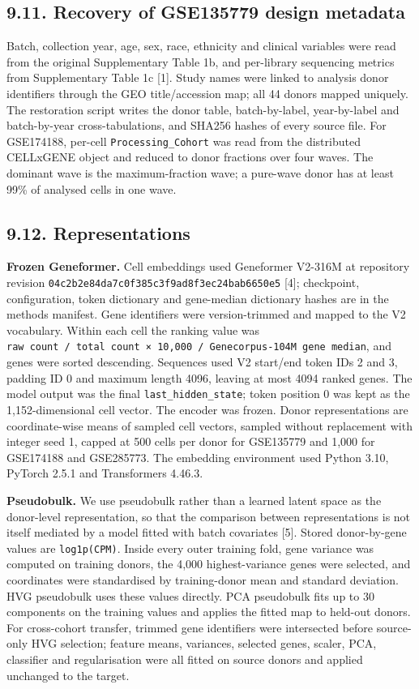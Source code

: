 \subsection{9.11. Recovery of GSE135779 design metadata}\label{recovery-of-gse135779-design-metadata}

Batch, collection year, age, sex, race, ethnicity and clinical variables were read from the original Supplementary Table 1b, and per-library sequencing metrics from Supplementary Table 1c {[}1{]}. Study names were linked to analysis donor identifiers through the GEO title/accession map; all 44 donors mapped uniquely. The restoration script writes the donor table, batch-by-label, year-by-label and batch-by-year cross-tabulations, and SHA256 hashes of every source file. For GSE174188, per-cell \texttt{Processing\_Cohort} was read from the distributed CELLxGENE object and reduced to donor fractions over four waves. The dominant wave is the maximum-fraction wave; a pure-wave donor has at least 99\% of analysed cells in one wave.

\subsection{9.12. Representations}\label{representations}

\textbf{Frozen Geneformer.} Cell embeddings used Geneformer V2-316M at repository revision \texttt{04c2b2e84da7c0f385c3f9ad8f3ec24bab6650e5} {[}4{]}; checkpoint, configuration, token dictionary and gene-median dictionary hashes are in the methods manifest. Gene identifiers were version-trimmed and mapped to the V2 vocabulary. Within each cell the ranking value was \texttt{raw\ count\ /\ total\ count\ ×\ 10,000\ /\ Genecorpus-104M\ gene\ median}, and genes were sorted descending. Sequences used V2 start/end token IDs 2 and 3, padding ID 0 and maximum length 4096, leaving at most 4094 ranked genes. The model output was the final \texttt{last\_hidden\_state}; token position 0 was kept as the 1,152-dimensional cell vector. The encoder was frozen. Donor representations are coordinate-wise means of sampled cell vectors, sampled without replacement with integer seed 1, capped at 500 cells per donor for GSE135779 and 1,000 for GSE174188 and GSE285773. The embedding environment used Python 3.10, PyTorch 2.5.1 and Transformers 4.46.3.

\textbf{Pseudobulk.} We use pseudobulk rather than a learned latent space as the donor-level representation, so that the comparison between representations is not itself mediated by a model fitted with batch covariates {[}5{]}. Stored donor-by-gene values are \texttt{log1p(CPM)}. Inside every outer training fold, gene variance was computed on training donors, the 4,000 highest-variance genes were selected, and coordinates were standardised by training-donor mean and standard deviation. HVG pseudobulk uses these values directly. PCA pseudobulk fits up to 30 components on the training values and applies the fitted map to held-out donors. For cross-cohort transfer, trimmed gene identifiers were intersected before source-only HVG selection; feature means, variances, selected genes, scaler, PCA, classifier and regularisation were all fitted on source donors and applied unchanged to the target.

